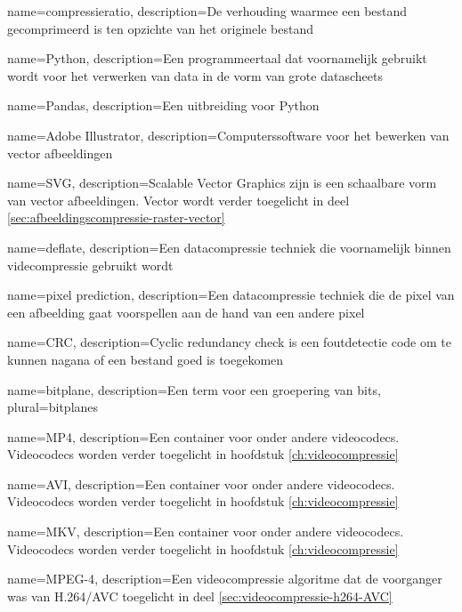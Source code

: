 {
	name={compressieratio},
	description={De verhouding waarmee een bestand gecomprimeerd is ten opzichte van het originele bestand}
}

{
	name={Python},
	description={Een programmeertaal dat voornamelijk gebruikt wordt voor het verwerken van data in de vorm van grote datascheets}
}

{
	name={Pandas},
	description={Een uitbreiding voor Python}
}

{
	name={Adobe Illustrator},
	description={Computerssoftware voor het bewerken van vector afbeeldingen}
}

{
	name={SVG},
	description={Scalable Vector Graphics zijn is een schaalbare vorm van vector afbeeldingen. Vector wordt verder toegelicht in deel \ref{sec:afbeeldingscompressie-raster-vector}}
}

{
	name={deflate},
	description={Een datacompressie techniek die voornamelijk binnen videcompressie gebruikt wordt}
}

{
	name={pixel prediction},
	description={Een datacompressie techniek die de pixel van een afbeelding gaat voorspellen aan de hand van een andere pixel}
}

{
	name={CRC},
	description={Cyclic redundancy check is een foutdetectie code om te kunnen nagana of een bestand goed is toegekomen}
}

{
	name={bitplane},
	description={Een term voor een groepering van bits},
	plural={bitplanes}
}

{
	name={MP4},
	description={Een container voor onder andere videocodecs. Videocodecs worden verder toegelicht in hoofdstuk \ref{ch:videocompressie}}
}

{
	name={AVI},
	description={Een container voor onder andere videocodecs. Videocodecs worden verder toegelicht in hoofdstuk \ref{ch:videocompressie}}
}

{
	name={MKV},
	description={Een container voor onder andere videocodecs. Videocodecs worden verder toegelicht in hoofdstuk \ref{ch:videocompressie}}
}

{
	name={MPEG-4},
	description={Een videocompressie algoritme dat de voorganger was van H.264/AVC toegelicht in deel \ref{sec:videocompressie-h264-AVC}}
}


